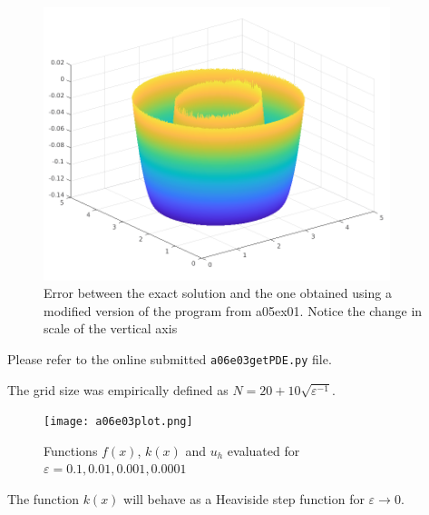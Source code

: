 \begin{figure}[H]
	\centering
	\includegraphics[width=0.9\textwidth]{Documentation/Figures/a06ex02d_error.png} 
	\caption{Error between the exact solution and the one obtained using a modified version of the program from a05ex01. Notice the change in scale of the vertical axis}
	\label{fig:a05ex02b}
\end{figure}

Please refer to the online submitted \texttt{a06e03getPDE.py} file.


The grid size was empirically defined as $N = 20 + 10\sqrt{\varepsilon^{-1}}$.

\begin{figure}[H]
	\centering
	\texttt{[image: a06e03plot.png]}
	\caption{Functions $f(x)$, $k(x)$ and $u_h$ evaluated for $\varepsilon = 0.1, 0.01, 0.001, 0.0001$}
	\label{fig:a06e03plot}
\end{figure}

The function $k(x)$ will behave as a Heaviside step function for $\varepsilon \to 0$.